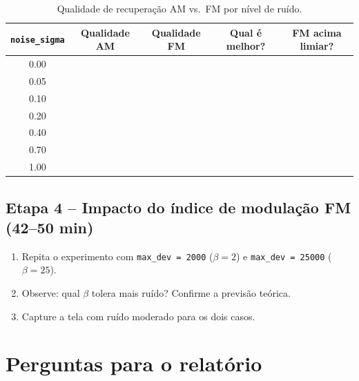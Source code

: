 \documentclass[11pt,a4paper]{article}
\begin{document}
\begin{table}[H]
  \centering
  \begin{tabular}{c c c c c}
    \toprule
    \texttt{noise\_sigma} & \textbf{Qualidade AM} & \textbf{Qualidade FM}
      & \textbf{Qual é melhor?} & \textbf{FM acima limiar?} \\
    \midrule
    0.00 & & & & \\
    0.05 & & & & \\
    0.10 & & & & \\
    0.20 & & & & \\
    0.40 & & & & \\
    0.70 & & & & \\
    1.00 & & & & \\
    \bottomrule
  \end{tabular}
  \caption{Qualidade de recuperação AM vs.\ FM por nível de ruído.}
  \label{tab:snr}
\end{table}

\subsection*{Etapa 4 -- Impacto do índice de modulação FM (42--50 min)}

\begin{instrucao}
\begin{enumerate}[label=\arabic*.]
  \item Repita o experimento com \texttt{max\_dev = 2000} ($\beta = 2$) e
    \texttt{max\_dev = 25000} ($\beta = 25$).
  \item Observe: qual $\beta$ tolera mais ruído? Confirme a previsão teórica.
  \item Capture a tela com ruído moderado para os dois casos.
\end{enumerate}
\end{instrucao}

\section{Perguntas para o relatório}
\end{document}
